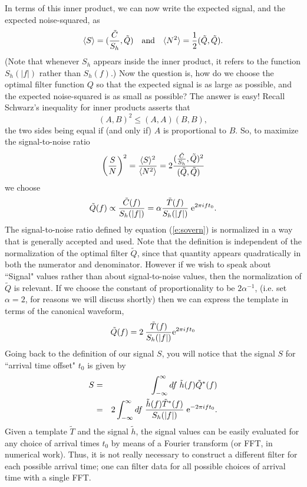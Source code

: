 In terms of this inner product, we can now write the expected signal, and the expected
noise-squared, as
\begin{equation}
\langle S \rangle = ({\tilde C \over S_h},\tilde Q)
\quad {\rm and} \quad \langle N^2 \rangle = {1 \over 2} (\tilde Q, \tilde Q).
\end{equation}
(Note that whenever $S_h$ appears inside the inner product, it refers
to the function $S_h(|f|)$ rather than $S_h(f)$.) Now the question is,
how do we choose the optimal filter function $Q$ so that the expected
signal is as large as possible, and the expected noise-squared is as
small as possible?  The answer is easy! Recall Schwarz's inequality for
inner products asserts that
\begin{equation}
        (A,B)^2 \le (A,A)(B,B),
\end{equation}
the two sides being equal if (and only if) $A$ is proportional to $B$.
So, to maximize the signal-to-noise ratio 
\begin{equation}
\label{e:sovern}
\left( {S \over N} \right)^2 ={\langle S \rangle^2 \over \langle N^2
\rangle} = 2 { ({\tilde C \over S_h},\tilde Q)^2 \over (\tilde Q,
\tilde Q)}
\end{equation}
we choose
\begin{equation}
\tilde Q(f) \propto {\tilde C(f) \over S_h(|f|)} = 
\alpha {\tilde T(f) \over S_h(|f|)} \; {\rm e}^{2 \pi i f t_0}.
\end{equation}
The signal-to-noise ratio defined by equation (\ref{e:sovern}) is normalized
in a way that is generally accepted and used.  Note that the definition is
independent of the normalization of the optimal filter $\tilde Q$, since
that quantity appears quadratically in both the numerator and denominator.
However if we wish to speak about ``Signal" values rather than about
signal-to-noise values, then the normalization of $\tilde Q$ is relevant.
If we choose the constant of proportionality to be $2 \alpha^{-1}$,
(i.e. set $\alpha = 2$, for reasons we will discuss shortly) then we
can express the template in terms of the canonical waveform,
\begin{equation}
\label{e:optimal}
        \tilde{Q}(f)=2 \> \frac{\tilde{T}(f)}{S_h(|f|)} {\rm e}^{2\pi i f t_0}
\end{equation}
Going back to the definition of our signal $S$, you will notice that the
signal $S$ for ``arrival time offset" $t_0$ is given by
\begin{eqnarray}
\nonumber
S &=& \int_{-\infty}^\infty df \; \tilde h(f) \tilde Q^* (f) \\
\label{e:lag}
  &=& 2 \int_{-\infty}^\infty df \; { \tilde h(f) \tilde T^* (f) 
\over S_h(|f|)} \; {\rm e}^{- 2 \pi i f t_0}.
\end{eqnarray}
Given a template $\tilde T$ and the signal $\tilde h$, the signal
values can be easily evaluated for any choice of arrival times $t_0$ by
means of a Fourier transform (or FFT, in numerical work).  Thus, it is
not really necessary to construct a different filter for each possible
arrival time; one can filter data for all possible choices of arrival
time with a single FFT.

